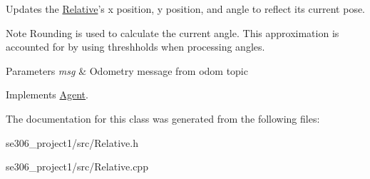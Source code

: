 Updates the \hyperlink{classRelative}{Relative}'s x position, y position, and angle to reflect its current pose. 

\begin{DoxyNote}{Note}
Rounding is used to calculate the current angle. This approximation is accounted for by using threshholds when processing angles. 
\end{DoxyNote}

\begin{DoxyParams}{Parameters}
{\em msg} & Odometry message from odom topic \\
\hline
\end{DoxyParams}


Implements \hyperlink{classAgent}{Agent}.



The documentation for this class was generated from the following files\-:\begin{DoxyCompactItemize}
\item 
se306\-\_\-project1/src/Relative.\-h\item 
se306\-\_\-project1/src/Relative.\-cpp\end{DoxyCompactItemize}
